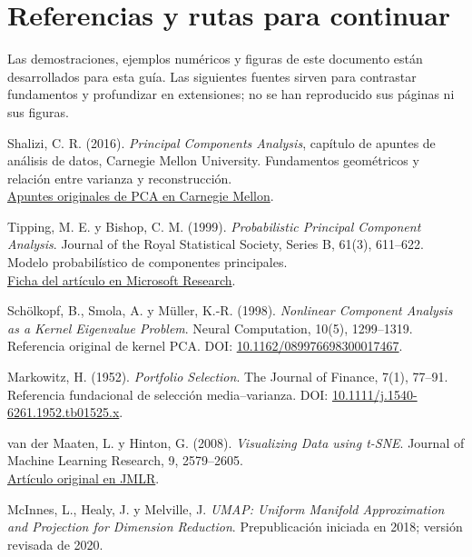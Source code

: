 \documentclass[11pt,a4paper]{article}
\theoremstyle{definition}
\begin{document}
\section{Referencias y rutas para continuar}\begingroup\footnotesize\setlength{\parskip}{2pt}
Las demostraciones, ejemplos numéricos y figuras de este documento están desarrollados para esta guía. Las siguientes fuentes sirven para contrastar fundamentos y profundizar en extensiones; no se han reproducido sus páginas ni sus figuras.
\begin{enumerate}[label={[\arabic*]},itemsep=3pt]
\item Shalizi, C. R. (2016). \textit{Principal Components Analysis}, capítulo de apuntes de análisis de datos, Carnegie Mellon University. Fundamentos geométricos y relación entre varianza y reconstrucción.\\
\href{https://www.stat.cmu.edu/~cshalizi/uADA/16/lectures/17.pdf}{Apuntes originales de PCA en Carnegie Mellon}.
\item Tipping, M. E. y Bishop, C. M. (1999). \textit{Probabilistic Principal Component Analysis}. Journal of the Royal Statistical Society, Series B, 61(3), 611--622. Modelo probabilístico de componentes principales.\\
\href{https://www.microsoft.com/en-us/research/publication/probabilistic-principal-component-analysis/}{Ficha del artículo en Microsoft Research}.
\item Schölkopf, B., Smola, A. y Müller, K.-R. (1998). \textit{Nonlinear Component Analysis as a Kernel Eigenvalue Problem}. Neural Computation, 10(5), 1299--1319. Referencia original de kernel PCA. DOI: \href{https://doi.org/10.1162/089976698300017467}{10.1162/089976698300017467}.
\item Markowitz, H. (1952). \textit{Portfolio Selection}. The Journal of Finance, 7(1), 77--91. Referencia fundacional de selección media--varianza. DOI: \href{https://doi.org/10.1111/j.1540-6261.1952.tb01525.x}{10.1111/j.1540-6261.1952.tb01525.x}.
\item van der Maaten, L. y Hinton, G. (2008). \textit{Visualizing Data using t-SNE}. Journal of Machine Learning Research, 9, 2579--2605.\\
\href{https://www.jmlr.org/papers/v9/vandermaaten08a.html}{Artículo original en JMLR}.
\item McInnes, L., Healy, J. y Melville, J. \textit{UMAP: Uniform Manifold Approximation and Projection for Dimension Reduction}. Prepublicación iniciada en 2018; versión revisada de 2020.\\

\end{enumerate}
\end{document}
